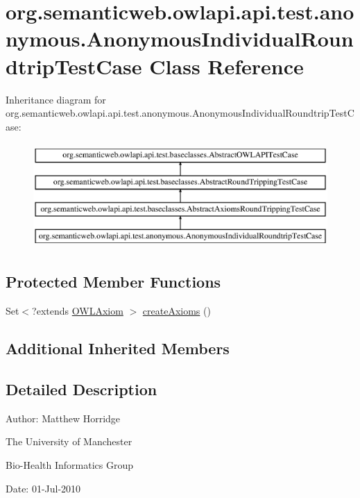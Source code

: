 \hypertarget{classorg_1_1semanticweb_1_1owlapi_1_1api_1_1test_1_1anonymous_1_1_anonymous_individual_roundtrip_test_case}{\section{org.\-semanticweb.\-owlapi.\-api.\-test.\-anonymous.\-Anonymous\-Individual\-Roundtrip\-Test\-Case Class Reference}
\label{classorg_1_1semanticweb_1_1owlapi_1_1api_1_1test_1_1anonymous_1_1_anonymous_individual_roundtrip_test_case}
}
Inheritance diagram for org.\-semanticweb.\-owlapi.\-api.\-test.\-anonymous.\-Anonymous\-Individual\-Roundtrip\-Test\-Case\-:\begin{figure}[H]
\begin{center}
\leavevmode
\includegraphics[height=4.000000cm]{classorg_1_1semanticweb_1_1owlapi_1_1api_1_1test_1_1anonymous_1_1_anonymous_individual_roundtrip_test_case}
\end{center}
\end{figure}
\subsection*{Protected Member Functions}
\begin{DoxyCompactItemize}
\item 
Set$<$?extends \hyperlink{interfaceorg_1_1semanticweb_1_1owlapi_1_1model_1_1_o_w_l_axiom}{O\-W\-L\-Axiom} $>$ \hyperlink{classorg_1_1semanticweb_1_1owlapi_1_1api_1_1test_1_1anonymous_1_1_anonymous_individual_roundtrip_test_case_a4fe92c18a048ec8655b46e2cb2a1ab06}{create\-Axioms} ()
\end{DoxyCompactItemize}
\subsection*{Additional Inherited Members}


\subsection{Detailed Description}
Author\-: Matthew Horridge\par
 The University of Manchester\par
 Bio-\/\-Health Informatics Group\par
 Date\-: 01-\/\-Jul-\/2010 

